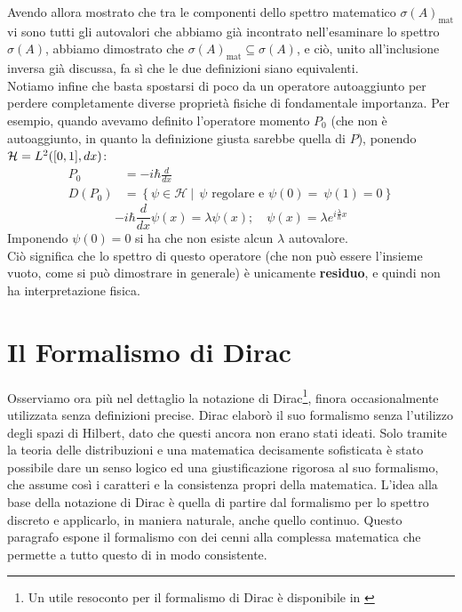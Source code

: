 \documentclass[../../FisicaTeorica.tex]{subfiles}
\begin{document}
Avendo allora mostrato che tra le componenti dello spettro matematico $\sigma(A)_{\text{mat}}$ vi sono tutti gli autovalori che abbiamo già incontrato nell'esaminare lo spettro $\sigma(A)$, abbiamo dimostrato che $\sigma(A)_{\text{mat}} \subseteq \sigma(A)$, e ciò, unito all'inclusione inversa già discussa, fa sì che le due definizioni siano equivalenti.\\
Notiamo infine che basta spostarsi di poco da un operatore autoaggiunto per perdere completamente diverse proprietà fisiche di fondamentale importanza. Per esempio, quando avevamo definito l'operatore momento $P_0$ (che non è autoaggiunto, in quanto la definizione giusta sarebbe quella di $P$), ponendo $\mathcal{H} = L^2([0,1],dx)$:
\begin{align*}
P_0&=-i\hbar \frac{d}{dx}\\
D\left(P_0\right)&=\left\{\psi\in\mathcal{H}\ |\ \ \psi\text{ regolare e } \psi\left(0\right)=\ \psi\left(1\right)=0\right\}
\end{align*}
\[
-i\hbar \frac{d}{dx}\psi(x) = \lambda \psi(x); \quad \psi(x) = \lambda e^{i\frac{\lambda}{\hbar}x}
\]
Imponendo $\psi \left(0\right)=0$ si ha che non esiste alcun $\lambda$ autovalore.\\ Ciò significa che lo spettro di questo operatore (che non può essere l'insieme vuoto, come si può dimostrare in generale) è unicamente \textbf{residuo}, e quindi non ha interpretazione fisica.









\section{Il Formalismo di Dirac}
Osserviamo ora più nel dettaglio la notazione di Dirac\footnote{Un utile resoconto per il formalismo di Dirac è disponibile in \cite{fonti_dirac}}, finora occasionalmente utilizzata senza definizioni precise.
Dirac elaborò il suo formalismo senza l'utilizzo degli spazi di Hilbert, dato che questi ancora non erano stati ideati. Solo tramite la teoria delle distribuzioni e una matematica decisamente sofisticata è stato possibile dare un senso logico ed una giustificazione rigorosa al suo formalismo, che assume così i caratteri e la consistenza propri della matematica. L'idea alla base della notazione di Dirac è quella di partire dal formalismo per lo spettro discreto e applicarlo, in maniera naturale, anche quello continuo. Questo paragrafo espone il formalismo con dei cenni alla complessa matematica che permette a tutto questo di  in modo consistente.\\
\end{document}
